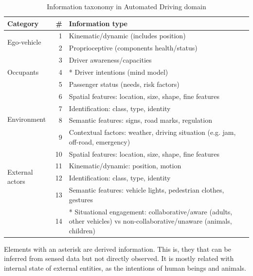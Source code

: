 \begin{table}%
    \caption{Information taxonomy in Automated Driving domain}
    \label{tab:info-taxonomy}
    \begin{tabular*}{\linewidth}{lrp{5.8cm}} %
        \hline %
        \textbf{Category} & \textbf{\#}	& \textbf{Information type}	\\
        \hline %
        \multirow{2}{*}{Ego-vehicle}
        & 1 & Kinematic/dynamic (includes position) \\
        & 2 & Proprioceptive (components health/status) \\
        \hline %
        \multirow{3}{*}{Occupants}
        & 3 & Driver awareness/capacities \\
        & 4 & * Driver intentions (mind model)  \\
        & 5 & Passenger status (needs, risk factors) \\
        \hline %
        \multirow{4}{*}{Environment}
        & 6 & Spatial features: location, size, shape, fine features 
        \\
        & 7 & Identification: class, type, identity \\
        & 8 & Semantic features: signs, road marks, regulation \\
        & 9 & Contextual factors: weather, driving situation (e.g. jam, 
        off-road, emergency) \\
        \hline %
        \multirow{4}{*}{External actors}
        & 10 & Spatial features: location, size, shape, fine features  \\
        & 11 & Kinematic/dynamic: position, motion \\
        & 12 & Identification: class, type, identity \\ 
        & 13 & Semantic features: vehicle lights, pedestrian clothes, gestures 
        \\
        & 14 & * Situational engagement: collaborative/aware 
        (adults, other vehicles) vs non-collaborative/unaware 
        (animals, children) \\ 
        \hline %
    \end{tabular*}
\end{table}

Elements with an asterisk are derived information. This is, they that can 
be inferred from sensed data but not directly observed. It is mostly related 
with internal state of external entities, as the intentions of human beings and 
animals.

